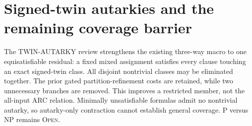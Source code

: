 \section{Signed-twin autarkies and the remaining coverage barrier}
The TWIN-AUTARKY review strengthens the existing three-way macro to one
equisatisfiable residual: a fixed mixed assignment satisfies every
clause touching an exact signed-twin class. All disjoint nontrivial
classes may be eliminated together. The prior gated partition-refinement
costs are retained, while two unnecessary branches are removed.
This improves a restricted member, not the all-input ARC relation.
Minimally unsatisfiable formulas admit no nontrivial autarky, so
autarky-only contraction cannot establish general coverage.
P versus NP remains \textsc{Open}.
